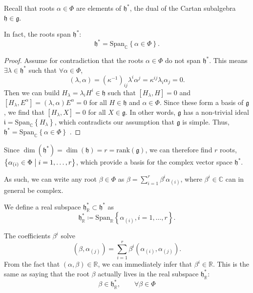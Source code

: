 Recall that roots $\alpha \in \Phi$ are elements of $\mathfrak{h}^*$, the dual of the Cartan subalgebra $\mathfrak{h} \in \mathfrak{g}$.

\begin{claim}
  In fact, the roots span $\mathfrak{h}^*$:
  \begin{equation}
    \mathfrak{h}^* = \text{Span}_{\mathbb{C}}\left\{\alpha \in \Phi\right\}.
  \end{equation}
\end{claim}
\begin{proof}
  Assume for contradiction that the roots $\alpha \in \Phi$ do not span $\mathfrak{h}^*$. This means $\exists \lambda \in \mathfrak{h}^*$ such that $\forall \alpha \in \Phi$, 
  \begin{equation}
    (\lambda, \alpha) = (\kappa^{-1})_{ij} \lambda^{i} \alpha^{j} = \kappa^{ij} \lambda_{i} \alpha_{j} = 0.
  \end{equation}
  Then we can build $H_{\lambda} = \lambda_{i} H^{i} \in \mathfrak{h}$ such that $ [H_{\lambda}, H] = 0$ and $[H_{\lambda}, E^{\alpha}] = (\lambda, \alpha) E^{\alpha} = 0$ for all $H \in \mathfrak{h}$ and $\alpha \in \Phi$.
  Since these form a basis of $\mathfrak{g}$, we find that $[H_{\lambda}, X] = 0$ for all $X \in \mathfrak{g}$.
  In other words, $\mathfrak{g}$ has a non-trivial ideal $\mathfrak{i} = \text{Span}_{\mathbb{C}}\left\{H_{\lambda}\right\}$, which contradicts our assumption that $\mathfrak{g}$ is simple.
  Thus, $\mathfrak{h}^* = \text{Span}_{\mathbb{C}}\left\{\alpha \in \Phi\right\}$ .
\end{proof}

\begin{corollary}
  Since $\dim(\mathfrak{h}^*) = \dim(\mathfrak{h}) = r = \text{rank}(\mathfrak{g})$, we can therefore find $r$ roots, $\left\{ \alpha_{(i)} \in \Phi \suchthat i = 1, \dots, r \right\}$, which provide a basis for the complex vector space $\mathfrak{h}^*$.
\end{corollary}
As such, we can write any root $\beta \in \Phi$ as $\beta = \sum_{i=1}^{r} \beta^{i} \alpha_{(i)}$, where $\beta^{i} \in \mathbb{C}$ can in general be complex.
\begin{definition}[]
  We define a real subspace $\mathfrak{h}^*_{\mathbb{R}} \subset \mathfrak{h}^*$ as
  \begin{equation}
    \mathfrak{h}^*_{\mathbb{R}} \coloneqq \text{Span}_{\mathbb{R}}\left\{ \alpha_{(i)}, i = 1, \dots, r\right\}.
  \end{equation}
\end{definition}
The coefficients $\beta^i $ solve
\begin{equation}
  (\beta, \alpha_{(j)}) = \sum_{i=1}^{r} \beta^i (\alpha_{(i)}, \alpha_{(j)}).
\end{equation}
From the fact that $(\alpha, \beta) \in \mathbb{R}$, we can immediately infer that $\beta^i \in \mathbb{R}$.
This is the same as saying that the root $\beta$ actually lives in the real subspace $\mathfrak{h}^*_{\mathbb{R}}$:
\begin{equation}
  \boxed{\beta \in \mathfrak{h}^*_{\mathbb{R}}, \qquad \forall\beta \in \Phi}
\end{equation}

